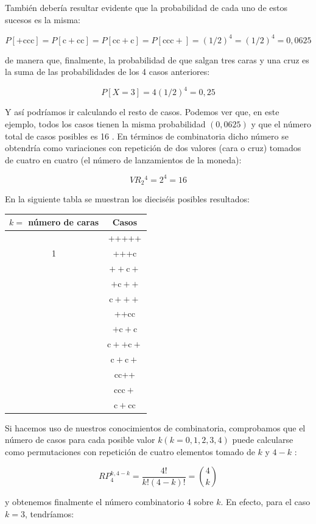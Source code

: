 \documentclass[
]{article}
\begin{document}
También debería resultar evidente que la probabilidad de cada uno de estos sucesos es la misma:

\[
P[+\mathrm{ccc}]=P[\mathrm{c}+\mathrm{cc}]=P[\mathrm{cc}+\mathrm{c}]=P[\mathrm{ccc}+]=(1 / 2)^{4}=(1 / 2)^{4}=0,0625
\]

de manera que, finalmente, la probabilidad de que salgan tres caras y una cruz es la suma de las probabilidades de los 4 casos anteriores:

\[
P[X=3]=4(1 / 2)^{4}=0,25
\]

Y así podríamos ir calculando el resto de casos. Podemos ver que, en este ejemplo, todos los casos tienen la misma probabilidad \((0,0625)\) y que el número total de casos posibles es 16 . En términos de combinatoria dicho número se obtendría como variaciones con repetición de dos valores (cara o cruz) tomados de cuatro en cuatro (el número de lanzamientos de la moneda):

\[
V R_{2}{ }^{4}=2^{4}=16
\]

En la siguiente tabla se muestran los dieciséis posibles resultados:

\begin{longtable}[]{@{}cc@{}}
\toprule\noalign{}
\(k=\) número de caras & Casos \\
\midrule\noalign{}
\endhead
\bottomrule\noalign{}
\endlastfoot
0 & +++++ \\
1 & +++c \\
& \(++\mathrm{c}+\) \\
& \(+\mathrm{c}++\) \\
& \(\mathrm{c}+++\) \\
& ++cc \\
& \(+\mathrm{c}+\mathrm{c}\) \\
& \(\mathrm{c}++\mathrm{c}+\) \\
& \(\mathrm{c}+\mathrm{c}+\) \\
& cc++ \\
& \(\mathrm{ccc}+\) \\
& \(\mathrm{c}+\mathrm{cc}\) \\
\end{longtable}

Si hacemos uso de nuestros conocimientos de combinatoria, comprobamos que el número de casos para cada posible valor \(k(k=0,1,2,3,4)\) puede calcularse como permutaciones con repetición de cuatro elementos tomado de \(k\) y \(4-k\) :

\[
R P_{4}^{k, 4-k}=\frac{4!}{k!(4-k)!}=\binom{4}{k}
\]

y obtenemos finalmente el número combinatorio 4 sobre \(k\). En efecto, para el caso \(k=3\), tendríamos:
\end{document}
